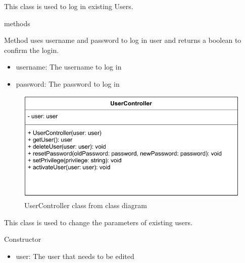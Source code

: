 This class is used to log in existing Users.

\begin{methodenv}{methods}


Method uses username and password to log in user and returns a boolean to confirm the login.

\begin{itemize}
	\item{username:}
	The username to log in
	\item{password:}
	The password to log in
\end{itemize}
\end{methodenv}





\begin{figure}[H]
\centerline{\includegraphics[scale=1]{res/Klassen/UserControllerClass.pdf}}
\caption{UserController class from class diagram}
\end{figure}

This class is used to change the parameters of existing users.

\begin{methodenv}{Constructor}



\begin{itemize}
	\item{user:}
	The user that needs to be edited
\end{itemize}
\end{methodenv}


